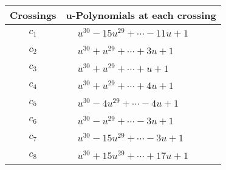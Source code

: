 \documentclass[1p]{elsarticle_modified}
\theoremstyle{definition}
\begin{document}
\begin{tabular}{m{50pt}|m{274pt}}
Crossings & \hspace{64pt}u-Polynomials at each crossing \\
\hline $$\begin{aligned}c_{1}\end{aligned}$$&$\begin{aligned}
&u^{30}-15 u^{29}+\cdots-11 u+1
\end{aligned}$\\
\hline $$\begin{aligned}c_{2}\end{aligned}$$&$\begin{aligned}
&u^{30}+u^{29}+\cdots+3 u+1
\end{aligned}$\\
\hline $$\begin{aligned}c_{3}\end{aligned}$$&$\begin{aligned}
&u^{30}+u^{29}+\cdots+u+1
\end{aligned}$\\
\hline $$\begin{aligned}c_{4}\end{aligned}$$&$\begin{aligned}
&u^{30}+u^{29}+\cdots+4 u+1
\end{aligned}$\\
\hline $$\begin{aligned}c_{5}\end{aligned}$$&$\begin{aligned}
&u^{30}-4 u^{29}+\cdots-4 u+1
\end{aligned}$\\
\hline $$\begin{aligned}c_{6}\end{aligned}$$&$\begin{aligned}
&u^{30}- u^{29}+\cdots-3 u+1
\end{aligned}$\\
\hline $$\begin{aligned}c_{7}\end{aligned}$$&$\begin{aligned}
&u^{30}-15 u^{29}+\cdots-3 u+1
\end{aligned}$\\
\hline $$\begin{aligned}c_{8}\end{aligned}$$&$\begin{aligned}
&u^{30}+15 u^{29}+\cdots+17 u+1
\end{aligned}$\\

\end{tabular}
\end{document}
